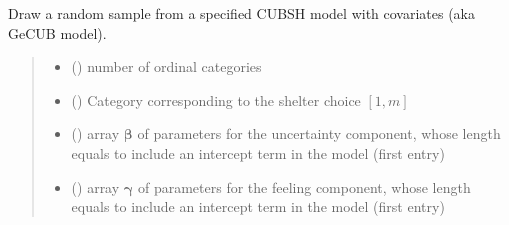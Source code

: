 \documentclass[letterpaper,10pt,english]{sphinxmanual}
\begin{document}
\begin{fulllineitems}
\label{\detokenize{cubmods:cubmods.cubsh_ywx.draw}}
\pysigstartsignatures
{}
\pysigstopsignatures
\sphinxAtStartPar
Draw a random sample from a specified CUBSH model with covariates
(aka GeCUB model).
\begin{quote}\begin{description}
\begin{itemize}
\item {} 
\sphinxAtStartPar
{} () \textendash{} number of ordinal categories

\item {} 
\sphinxAtStartPar
{} () \textendash{} Category corresponding to the shelter choice \([1,m]\)

\item {} 
\sphinxAtStartPar
{} () \textendash{} array \(\pmb \beta\) of parameters for the uncertainty component, whose length equals 
 to include an intercept term in the model (first entry)

\item {} 
\sphinxAtStartPar
{} () \textendash{} array \(\pmb \gamma\) of parameters for the feeling component, whose length equals 
 to include an intercept term in the model (first entry)


\end{itemize}
\end{description}
\end{quote}
\end{fulllineitems}
\end{document}
